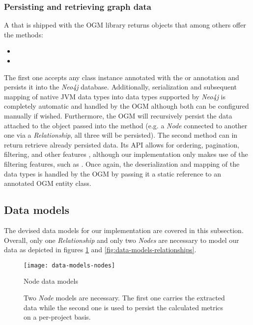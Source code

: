 \documentclass[12pt,a4paper]{report}
\begin{document}
\subsubsection{Persisting and retrieving graph data}
A 
that is shipped with the OGM library returns  objects that among
others offer the methods:
\begin{itemize}[noitemsep]
    \item {}
    \item {}
\end{itemize}
The first one accepts any class instance
annotated with the  or  annotation
and persists it into the \textit{Neo4j} database. Additionally, serialization
and subsequent mapping of native JVM data types into data types supported by
\textit{Neo4j} is completely automatic and handled by the OGM \cite{neo4j-ogm}
although both can be configured manually if wished. Furthermore, the OGM will
recursively persist the data attached to the object passed into the  method (e.g. a \textit{Node} connected to another one via a \textit{
Relationship}, all three will be persisted). The second method can in return
retrieve already persisted data. Its API allows for ordering, pagination,
filtering, and other features \cite{neo4j-ogm}, although our implementation
only makes use of the filtering features, such as
.
Once again, the deserialization and mapping of the data types is handled
by the OGM by passing it a static reference to an annotated OGM entity class.


\subsection{Data models} \label{subsect:data-models}

The devised data models for our implementation are covered in this
subsection. Overall, only one \textit{Relationship} and only two \textit{Nodes}
are necessary to model our data as depicted in figures
\ref{fig:data-models-nodes} and \ref{fig:data-models-relationships}.

\begin{figure}[htbp]
\centering
\texttt{[image: data-models-nodes]}
\caption{Node data models}
\caption*{\centering
  Two \textit{Node} models are necessary. The first one carries the extracted
  data while the second one is used to persist the calculated metrics on a
  per\hyp project basis.
}
\label{fig:data-models-nodes}
\end{figure}
\end{document}
